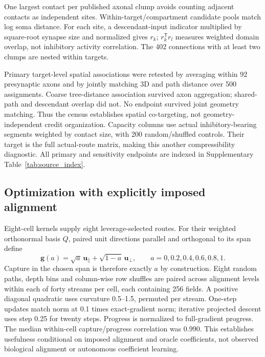 One largest contact per published axonal clump avoids counting adjacent contacts as independent sites. Within-target/compartment candidate pools match log soma distance. For each site, a descendant-input indicator multiplied by square-root synapse size and normalized gives $r_k$; $r_k^{\mathsf T}r_l$ measures weighted domain overlap, not inhibitory activity correlation. The 402 connections with at least two clumps are nested within targets.

Primary target-level spatial associations were retested by averaging within 92 presynaptic axons and by jointly matching 3D and path distance over 500 assignments. Coarse tree-distance association survived axon aggregation; shared-path and descendant overlap did not. No endpoint survived joint geometry matching. Thus the census establishes spatial co-targeting, not geometry-independent credit organization. Capacity columns use actual inhibitory-bearing segments weighted by contact size, with 200 random/shuffled controls. Their target is the full actual-route matrix, making this another compressibility diagnostic. All primary and sensitivity endpoints are indexed in Supplementary Table~\ref{tab:source_index}.

\subsection{Optimization with explicitly imposed alignment}
\label{note:alignment_controlled}
Eight-cell kernels supply eight leverage-selected routes. For their weighted orthonormal basis $Q$, paired unit directions parallel and orthogonal to its span define
\begin{equation}
 \bm g(a)=\sqrt a\,\bm u_\parallel+\sqrt{1-a}\,\bm u_\perp,
 \qquad a=0,0.2,0.4,0.6,0.8,1.
\end{equation}
Capture in the chosen span is therefore exactly $a$ by construction. Eight random paths, depth bins and column-wise row shuffles are paired across alignment levels within each of forty streams per cell, each containing 256 fields. A positive diagonal quadratic uses curvature 0.5--1.5, permuted per stream. One-step updates match norm at 0.1 times exact-gradient norm; iterative projected descent uses step 0.25 for twenty steps. Progress is normalized to full-gradient progress. The median within-cell capture/progress correlation was 0.990. This establishes usefulness conditional on imposed alignment and oracle coefficients, not observed biological alignment or autonomous coefficient learning.
